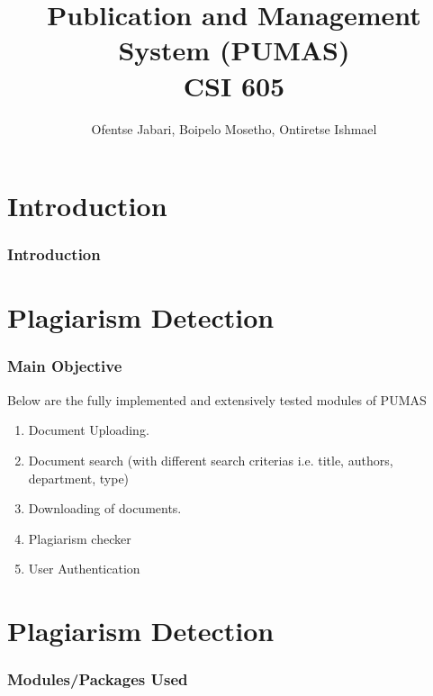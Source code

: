 \documentclass[t]{beamer}
\title{Publication and Management System (PUMAS) \\ CSI 605}
\author{Ofentse Jabari, Boipelo Mosetho, Ontiretse Ishmael}
\begin{document}
\begin{titleframe}
\end{titleframe}




\section{Introduction}
\begin{frame}
	\frametitle{Introduction}
	
\end{frame}





\section{Plagiarism Detection}
\begin{slidetop}
	\frametitle{Main Objective}
	
	Below are the fully implemented and extensively tested modules of PUMAS
	
	\begin{enumerate}
		\item Document Uploading.
		\item Document search (with different search criterias i.e. title, authors, department, type)
		\item Downloading of documents.
		\item Plagiarism checker
		\item User Authentication
		
	\end{enumerate}

\end{slidetop}




\section{Plagiarism Detection}
\begin{frame}
		\frametitle{Modules/Packages Used}
		
		
		\inputminted[firstline=1, 
					 lastline=5, 
		             frame=lines,
		             fontsize=\footnotesize
		             ]{python}{../pumas/docxToText.py}

\end{frame}
\end{document}
